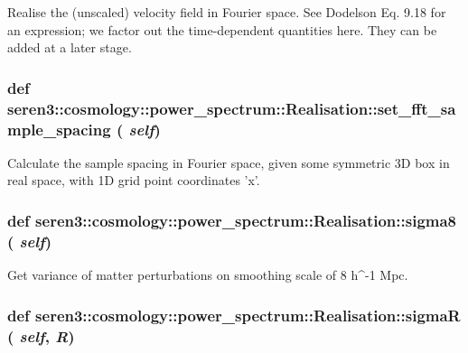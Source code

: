 \label{classseren3_1_1cosmology_1_1power__spectrum_1_1Realisation_a0e1f42e5de6f6d530735c8fe79529dd1}
\begin{DoxyVerb}Realise the (unscaled) velocity field in Fourier space. See 
   Dodelson Eq. 9.18 for an expression; we factor out the 
   time-dependent quantities here. They can be added at a later stage.\end{DoxyVerb}
 \hypertarget{classseren3_1_1cosmology_1_1power__spectrum_1_1Realisation_a70cae5b4e147c06dda4f195bf11876a2}{
\subsubsection[{set\_\-fft\_\-sample\_\-spacing}]{\setlength{\rightskip}{0pt plus 5cm}def seren3::cosmology::power\_\-spectrum::Realisation::set\_\-fft\_\-sample\_\-spacing ( {\em self})}}
\label{classseren3_1_1cosmology_1_1power__spectrum_1_1Realisation_a70cae5b4e147c06dda4f195bf11876a2}
\begin{DoxyVerb}Calculate the sample spacing in Fourier space, given some symmetric 3D 
box in real space, with 1D grid point coordinates 'x'.\end{DoxyVerb}
 \hypertarget{classseren3_1_1cosmology_1_1power__spectrum_1_1Realisation_a11401db5e3772aed682363e17a0bf8d8}{
\subsubsection[{sigma8}]{\setlength{\rightskip}{0pt plus 5cm}def seren3::cosmology::power\_\-spectrum::Realisation::sigma8 ( {\em self})}}
\label{classseren3_1_1cosmology_1_1power__spectrum_1_1Realisation_a11401db5e3772aed682363e17a0bf8d8}
\begin{DoxyVerb}Get variance of matter perturbations on smoothing scale of 
   8 h^-1 Mpc.\end{DoxyVerb}
 \hypertarget{classseren3_1_1cosmology_1_1power__spectrum_1_1Realisation_a7aa3738c4f9874c56702655c77463f98}{
\subsubsection[{sigmaR}]{\setlength{\rightskip}{0pt plus 5cm}def seren3::cosmology::power\_\-spectrum::Realisation::sigmaR ( {\em self}, \/   {\em R})}}
